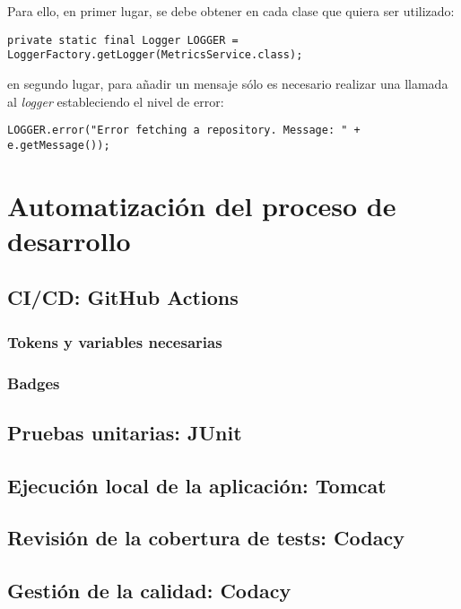Para ello, en primer lugar, se debe obtener en cada clase que quiera ser utilizado:\\
\begin{minipage}{\linewidth}
{\tiny
\begin{verbatim}
private static final Logger LOGGER = LoggerFactory.getLogger(MetricsService.class);
\end{verbatim}
}
\end{minipage}
en segundo lugar, para añadir un mensaje sólo es necesario realizar una llamada al \textit{logger} estableciendo el nivel de error:\\
\begin{minipage}{\linewidth}
{\tiny
\begin{verbatim}
LOGGER.error("Error fetching a repository. Message: " + e.getMessage());
\end{verbatim}
}
\end{minipage}

\section{Automatización del proceso de desarrollo}
\subsection{CI/CD: GitHub Actions}
\subsubsection{Tokens y variables necesarias}
\subsubsection{Badges}
\subsection{Pruebas unitarias: JUnit}
\subsection{Ejecución local de la aplicación: Tomcat}
\subsection{Revisión de la cobertura de tests: Codacy}
\subsection{Gestión de la calidad: Codacy}
